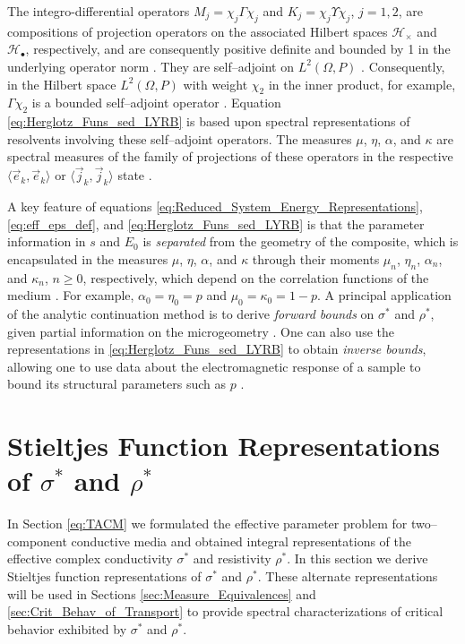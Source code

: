 \documentclass[english,12pt,jmp,graphicx]{revtex4-1}
\begin{document}
The integro-differential operators $M_j=\chi_j\Gamma\chi_j$ and
$K_j=\chi_j\Upsilon\chi_j$, $j=1,2$, are compositions of projection
operators on the associated Hilbert spaces $\mathscr{H}_\times$ and
$\mathscr{H}_\bullet$, respectively, and are consequently positive definite
and bounded by 1 in the underlying operator norm \cite{Rudin:87}. They
are self--adjoint 
on $L^2(\Omega,P)$ \cite{Golden:CMP-473}. Consequently, in the Hilbert
space $L^2(\Omega,P)$ with weight $\chi_2$ in the inner product, for example,
$\Gamma\chi_2$ is a bounded self--adjoint operator
\cite{Golden:CMP-473}. Equation \eqref{eq:Herglotz_Funs_sed_LYRB}
is based upon spectral representations of resolvents involving these
self--adjoint operators. The measures $\mu$, $\eta$, $\alpha$, and $\kappa$ are
spectral measures of the family of projections of these operators in
the respective $\langle\vec{e}_k,\vec{e}_k\rangle$ or $\langle\vec{j}_k,\vec{j}_k\rangle$ state
\cite{Golden:CMP-473,Reed-1980}.    

A key feature of equations
\eqref{eq:Reduced_System_Energy_Representations}, \eqref{eq:eff_eps_def}, and
\eqref{eq:Herglotz_Funs_sed_LYRB} is 
that the parameter information in $s$ and $E_0$ is {\it separated}
from the geometry of the composite, which is encapsulated in the 
measures $\mu$, $\eta$, $\alpha$, and $\kappa$ through their moments $\mu_n$, $\eta_n$,
$\alpha_n$, and $\kappa_n$, $n\geq0$, respectively, which depend on the correlation functions of the
medium \cite{Golden:CMP-473}. For example, $\alpha_0=\eta_0=p$ and
$\mu_0=\kappa_0=1-p$. A principal application of the analytic continuation
method is to derive \emph{forward bounds} on $\sigma^*$ and $\rho^*$, given partial
information on the microgeometry
\cite{Bergman:PRL-1285,Milton:APL-300,Golden:CMP-473,Bergman:AP-78}. One
can also use the
representations in
\eqref{eq:Herglotz_Funs_sed_LYRB} to obtain \emph{inverse bounds},
allowing one to use data about the electromagnetic response of a
sample to bound its structural parameters such as $p$
\cite{Day:JPCM-99,Golden:JoB:337}. 
%
\section{Stieltjes Function Representations of $\sigma^*$ and $\rho^*$}
\label{sec:SF_Reps}
%
In Section \ref{eq:TACM} we formulated the effective parameter problem
for two--component conductive media and obtained integral
representations of the effective complex conductivity $\sigma^*$ and
resistivity $\rho^*$. In this section we derive Stieltjes function
representations of $\sigma^*$ and $\rho^*$. These alternate
representations will be used in Sections
\ref{sec:Measure_Equivalences} and \ref{sec:Crit_Behav_of_Transport}
to provide spectral characterizations of critical behavior
exhibited by $\sigma^*$ and $\rho^*$.   
\end{document}
